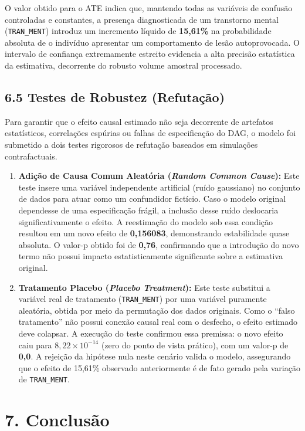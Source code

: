 O valor obtido para o ATE indica que, mantendo todas as variáveis de confusão controladas e constantes, a presença diagnosticada de um transtorno mental (\texttt{TRAN\_MENT}) introduz um incremento líquido de \textbf{15,61\%} na probabilidade absoluta de o indivíduo apresentar um comportamento de lesão autoprovocada. O intervalo de confiança extremamente estreito evidencia a alta precisão estatística da estimativa, decorrente do robusto volume amostral processado.

\subsection{6.5 Testes de Robustez (Refutação)}

Para garantir que o efeito causal estimado não seja decorrente de artefatos estatísticos, correlações espúrias ou falhas de especificação do DAG, o modelo foi submetido a dois testes rigorosos de refutação baseados em simulações contrafactuais.

\begin{enumerate}
    \item \textbf{Adição de Causa Comum Aleatória (\textit{Random Common Cause}):} Este teste insere uma variável independente artificial (ruído gaussiano) no conjunto de dados para atuar como um confundidor fictício. Caso o modelo original dependesse de uma especificação frágil, a inclusão desse ruído deslocaria significativamente o efeito. A reestimação do modelo sob essa condição resultou em um novo efeito de \textbf{0,156083}, demonstrando estabilidade quase absoluta. O valor-p obtido foi de \textbf{0,76}, confirmando que a introdução do novo termo não possui impacto estatisticamente significante sobre a estimativa original.
    \item \textbf{Tratamento Placebo (\textit{Placebo Treatment}):} Este teste substitui a variável real de tratamento (\texttt{TRAN\_MENT}) por uma variável puramente aleatória, obtida por meio da permutação dos dados originais. Como o ``falso tratamento'' não possui conexão causal real com o desfecho, o efeito estimado deve colapsar. A execução do teste confirmou essa premissa: o novo efeito caiu para \textbf{$8,22 \times 10^{-14}$} (zero do ponto de vista prático), com um valor-p de \textbf{0,0}. A rejeição da hipótese nula neste cenário valida o modelo, assegurando que o efeito de 15,61\% observado anteriormente é de fato gerado pela variação de \texttt{TRAN\_MENT}.
\end{enumerate}

\section{7. Conclusão}

